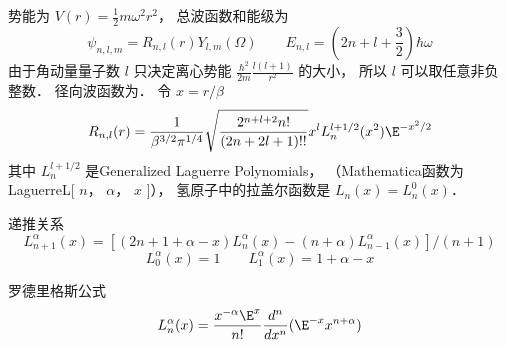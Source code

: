 

势能为 $V(r) = \frac{1}{2}m{\omega ^2}{r^2}$，  总波函数和能级为
\begin{equation}
{\psi_{n,l,m}} = {R_{n,l}}(r){Y_{l,m}}(\Omega )
\qquad
{E_{n,l}} = \left( {2n + l + \frac{3}{2}} \right)\hbar \omega 
\end{equation}    
由于角动量量子数 $l$ 只决定离心势能 $\frac{{{\hbar ^2}}}{{2m}}\frac{{l(l + 1)}}{{{r^2}}}$  的大小， 所以 $l$ 可以取任意非负整数． 径向波函数为． 令 $x = r/\beta $
 \begin{equation}
{R_{n,l}}(r) = \frac{1}{{{\beta ^{3/2}}{\pi ^{1/4}}}}\sqrt {\frac{{{2^{n + l + 2}}n!}}{{(2n + 2l + 1)!!}}} {x^l}L_n^{l + 1/2}({x^2}){\E^{ - {x^2}/2}}
\end{equation}
其中 $L_n^{l + 1/2}$ 是Generalized Laguerre Polynomials， （Mathematica函数为
LaguerreL[ $n$， $\alpha $，   $x$ ]）， 氢原子中的拉盖尔函数是 ${L_n}(x) = L_n^0(x)$． 

递推关系
 \begin{equation}
L_{n + 1}^\alpha (x) = [(2n + 1 + \alpha  - x)L_n^\alpha (x) - (n + \alpha )L_{n - 1}^\alpha (x)]/(n + 1)
\end{equation}
\begin{equation}
L_0^\alpha (x) = 1
\qquad
L_1^\alpha (x) = 1 + \alpha  - x
\end{equation}
    
罗德里格斯公式
 \begin{equation}
L_n^\alpha (x) = \frac{{{x^{ - \alpha }}{\E^x}}}{{n!}}\frac{{{d^n}}}{{d{x^n}}}({\E^{ - x}}{x^{n + \alpha }})
\end{equation}

